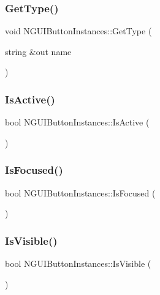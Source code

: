 \subsubsection{\texorpdfstring{Get\+Type()}{GetType()}}
{\footnotesize\ttfamily void N\+G\+U\+I\+Button\+Instances\+::\+Get\+Type (\begin{DoxyParamCaption}\item[{string \&out}]{name }\end{DoxyParamCaption})}

\hypertarget{class_n_g_u_i_button_instances_a507001ddb5e20bac93a02f07ff50b3c6}{}\label{class_n_g_u_i_button_instances_a507001ddb5e20bac93a02f07ff50b3c6} 
\subsubsection{\texorpdfstring{Is\+Active()}{IsActive()}}
{\footnotesize\ttfamily bool N\+G\+U\+I\+Button\+Instances\+::\+Is\+Active (\begin{DoxyParamCaption}{ }\end{DoxyParamCaption})}

\hypertarget{class_n_g_u_i_button_instances_a5fa1dc1b639f5f43f2bcfeb88e1006f6}{}\label{class_n_g_u_i_button_instances_a5fa1dc1b639f5f43f2bcfeb88e1006f6} 
\subsubsection{\texorpdfstring{Is\+Focused()}{IsFocused()}}
{\footnotesize\ttfamily bool N\+G\+U\+I\+Button\+Instances\+::\+Is\+Focused (\begin{DoxyParamCaption}{ }\end{DoxyParamCaption})}

\hypertarget{class_n_g_u_i_button_instances_a89aa8de0b508b3a4087b6309757b9b95}{}\label{class_n_g_u_i_button_instances_a89aa8de0b508b3a4087b6309757b9b95} 
\subsubsection{\texorpdfstring{Is\+Visible()}{IsVisible()}}
{\footnotesize\ttfamily bool N\+G\+U\+I\+Button\+Instances\+::\+Is\+Visible (\begin{DoxyParamCaption}{ }\end{DoxyParamCaption})}

